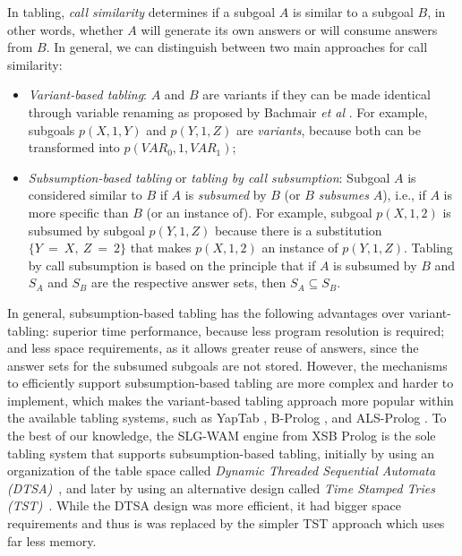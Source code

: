 In tabling, \emph{call similarity} determines if a subgoal $A$ is similar to a subgoal $B$,
in other words, whether $A$ will generate its own answers or will consume answers from $B$. In general,
we can distinguish between two main approaches for call similarity:

\begin{itemize}
   \item \emph{Variant-based tabling}: $A$ and $B$ are variants if they can be made identical
   through variable renaming as proposed by Bachmair \textit{et al} \cite{Bachmair-93}.
   For example, subgoals $p(X,1,Y)$ and $p(Y,1,Z)$ are \emph{variants},
   because both can be transformed into $p(VAR_0,1,VAR_1)$;
   \item \emph{Subsumption-based tabling} or \emph{tabling by call subsumption}: Subgoal $A$ is considered similar
   to $B$ if $A$ is \emph{subsumed} by $B$ (or $B$ \emph{subsumes} $A$), i.e., if $A$ is more specific than $B$
   (or an instance of). For example, subgoal $p(X,1,2)$ is subsumed by subgoal $p(Y,1,Z)$ because there
   is a substitution $\{Y~=~X,~Z~=~2\}$ that makes $p(X,1,2)$ an instance of $p(Y,1,Z)$. Tabling by call
   subsumption is based on the principle that if $A$ is subsumed by $B$ and $S_A$ and $S_B$ are the respective
   answer sets, then $S_A \subseteq S_B$.
\end{itemize}

In general, subsumption-based tabling has the following advantages over variant-tabling:
superior time performance, because less program resolution is required; and less space requirements,
as it allows greater reuse of answers, since the answer sets for the subsumed subgoals are not stored.
However, the mechanisms to efficiently support subsumption-based tabling are more complex and harder to
implement, which makes the variant-based tabling approach more popular within the available tabling systems,
such as YapTab \cite{Rocha-00a}, B-Prolog \cite{Zhou-00}, and ALS-Prolog \cite{Guo-01}.
To the best of our knowledge, the SLG-WAM \cite{Sagonas-98} engine from XSB Prolog is the sole tabling system that supports
subsumption-based tabling, initially by using an organization of the table space called
\emph{Dynamic Threaded Sequential Automata (DTSA)}~\cite{Rao-96}, and later by using an alternative design called
\emph{Time Stamped Tries (TST)}~\cite{Johnson-99}.
While the DTSA design was more efficient, it had bigger space requirements and thus is was replaced by the simpler
TST approach which uses far less memory.

